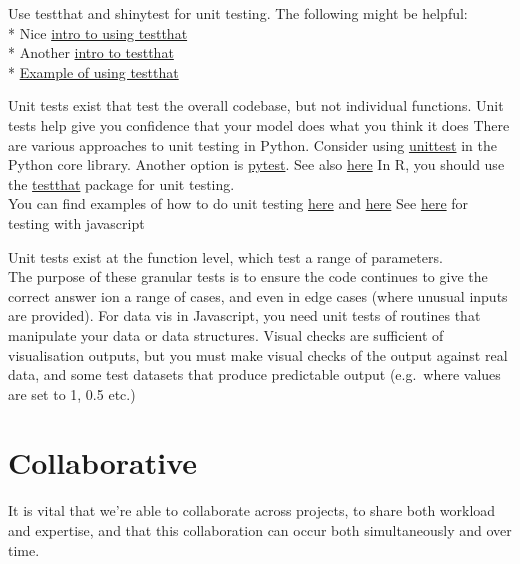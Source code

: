 \documentclass[]{book}
\begin{document}
Use testthat and shinytest for unit testing. The following might be helpful:\\
* Nice \href{https://katherinemwood.github.io/post/testthat/}{intro to using testthat}\\
* Another \href{https://towardsdatascience.com/unit-testing-in-r-68ab9cc8d211}{intro to testthat}\\
* \href{https://github.com/RobinL/costmodelr/tree/master/tests}{Example of using testthat}

Unit tests exist that test the overall codebase, but not individual functions.
Unit tests help give you confidence that your model does what you think it does
There are various approaches to unit testing in Python. Consider using \href{https://docs.python.org/3/library/unittest.html}{unittest} in the Python core library. Another option is \href{https://docs.pytest.org/en/latest/}{pytest}. See also \href{http://python-guide-pt-br.readthedocs.io/en/latest/writing/tests/}{here}
In R, you should use the \href{https://github.com/hadley/testthat}{testthat} package for unit testing.\\
You can find examples of how to do unit testing \href{https://github.com/ukgovdatascience/eesectors/tree/master/tests}{here} and \href{https://github.com/RobinL/costmodelr/tree/master/tests}{here} See \href{http://busypeoples.github.io/post/testing-d3-with-jasmine/}{here} for testing with javascript

Unit tests exist at the function level, which test a range of parameters.\\
The purpose of these granular tests is to ensure the code continues to give the correct answer ion a range of cases, and even in edge cases (where unusual inputs are provided).
For data vis in Javascript, you need unit tests of routines that manipulate your data or data structures. Visual checks are sufficient of visualisation outputs, but you must make visual checks of the output against real data, and some test datasets that produce predictable output (e.g.~where values are set to 1, 0.5 etc.)

\hypertarget{collaborate}{%
\section{Collaborative}\label{collaborate}}

It is vital that we're able to collaborate across projects, to share both workload and expertise, and that this collaboration can occur both simultaneously and over time.
\end{document}
